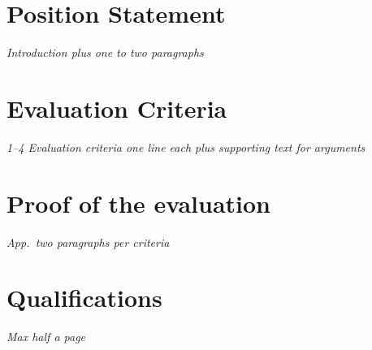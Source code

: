 \section{Position Statement}

\emph{Introduction plus one to two paragraphs}

\section{Evaluation Criteria}

\emph{1--4 Evaluation criteria one line each plus supporting text for arguments}

\section{Proof of the evaluation}

\emph{App.\ two paragraphs per criteria}

\section{Qualifications}

\emph{Max half a page}

\nocite{Larson2021}
